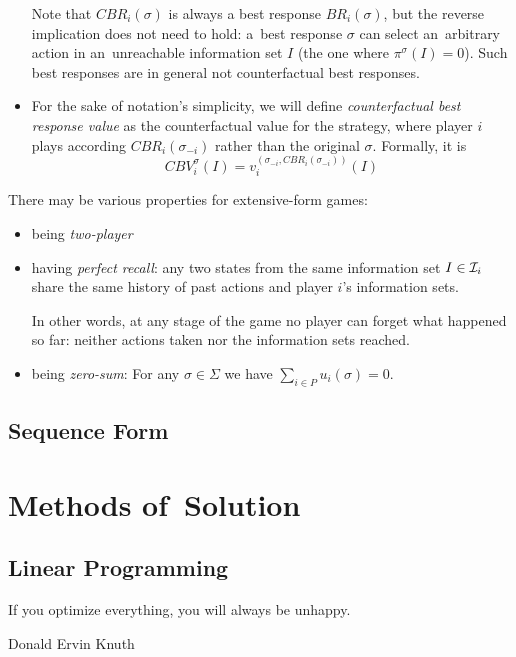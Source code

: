 \begin{itemize}
    Note that $CBR _i (\sigma)$ is always a best response $BR _i (\sigma)$, but the reverse implication does not need to hold:
    a~best response $\sigma$ can select an~arbitrary action in an~unreachable information set $I$ (the one where $\pi ^\sigma (I) = 0$).
    Such best responses are in general not counterfactual best responses.

  \item For the sake of notation's simplicity, we will define \emph{counterfactual best response value} as the counterfactual value for the strategy, where player $i$ plays according $CBR _i (\sigma _{-i})$ rather than the original $\sigma$.
    Formally, it is
    \[ CBV _i ^\sigma (I) = v _i ^{(\sigma _{-i}, CBR _i (\sigma _{-i} ))} (I) \]

\end{itemize}

There may be various properties for extensive-form games:

\begin{itemize}
  \item being \emph{two-player}
  \item having \emph{perfect recall}: any two states from the same information set $I \in \mathcal{I} _i$ share the same history of past actions and player $i$'s information sets.

    In other words, at any stage of the game no player can forget what happened so far:
    neither actions taken nor the information sets reached.
  \item being \emph{zero-sum}: For any $\sigma \in \Sigma$ we have $\sum _{i \in P} u _i (\sigma) = 0$.
\end{itemize}

\subsection{Sequence Form}

\section{Methods of~Solution}

\subsection{Linear Programming}
{
  \setlength{\epigraphwidth}{0.65\textwidth}
  \epigraph{
    If you optimize everything, you will always be unhappy.
  }{Donald Ervin Knuth}
}%
\todo

